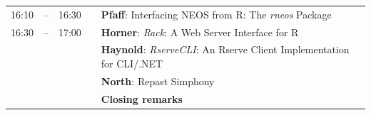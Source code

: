 \documentclass[letterpaper,10pt]{article}
\begin{document}
\begin{tabular}{rlrlp{5in}}
   16:10 & -- & 16:30  &   & \textbf{\color{Talk} Pfaff}: \small{Interfacing NEOS from R: The \emph{rneos} Package} \\
   16:30 & -- & 17:00  &   & \textbf{\color{LightningTalk} Horner}: \small{\emph{Rack}: A Web Server Interface for R} \\
          &    &        &    & \textbf{\color{LightningTalk} Haynold}: \small{\emph{RserveCLI}: An Rserve Client Implementation for CLI/.NET} \\
          &    &         &   & \textbf{\color{LightningTalk} North}: \small{Repast Simphony} \\
          &    &         &   & \textbf{\color{Breaks} Closing remarks} \\
\end{tabular}
\end{document}
